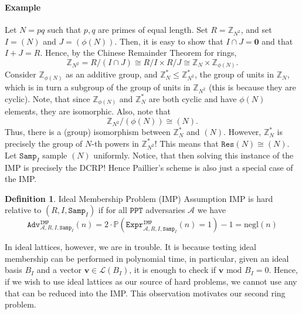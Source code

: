 \documentclass{article}
\theoremstyle{definition}
\newtheorem{definition}{Definition}[section]
\theoremstyle{example}
\newcommand{\A}{\mathcal{A}}
\renewcommand{\L}{\mathcal{L}}
\newcommand{\Prob}{\mathbb{P}}
\newcommand{\Int}{\mathbb{Z}}
\newcommand{\PPT}{\texttt{PPT}}
\newcommand{\negl}{\text{negl}}
\renewcommand{\mod}{\,\,\text{mod}\,\,}
\newcommand{\Expr}[2]{\texttt{Expr}^{\texttt{#1}}_{#2}}
\newcommand{\Adv}[2]{\texttt{Adv}^{\texttt{#1}}_{#2}}
\newcommand{\Samp}{\texttt{Samp}}
\renewcommand{\vec}[1]{\mathbf{#1}}
\begin{document}
\paragraph{Example}
  Let $N = pq$ such that $p, q$ are primes of equal length. Set $R =
  \Int_{N^2}$, and set $I = (N)$ and $J = (\phi(N))$. Then, it is easy to show
  that $I \cap J = \textbf{0}$ and that $I + J = R$. Hence, by the Chinese
  Remainder Theorem for rings,
  \[
    \Int_{N^2} = R/(I \cap J) \cong R/I \times R/J \cong \Int_N \times \Int_{\phi(N)}.
  \]
  Consider $\Int_{\phi(N)}$ as an additive group, and $\Int_N^* \leq
  \Int_{N^2}^*$, the group of units in $\Int_N$, which is in turn a subgroup of
  the group of units in $\Int_{N^2}$ (this is because they are cyclic). Note,
  that since $\Int_{\phi(N)}$ and $\Int_N^*$ are both cyclic and have $\phi(N)$
  elements, they are isomorphic. Also, note that
  \[
    \Int_{N^2}/(\phi(N)) \cong (N).
  \]
  Thus, there is a (group) isomorphism between $\Int_N^*$ and $(N)$. However,
  $\Int_N^*$ is precisely the group of $N$-th powers in $\Int_{N^2}^*$! This
  means that $\texttt{Res}(N) \cong (N)$. Let $\Samp_I$ sample $(N)$ uniformly.
  Notice, that then solving this instance of the IMP is precisely the DCRP! Hence
  Paillier's scheme is also just a special case of the IMP.
\begin{definition}{Ideal Membership Problem (IMP) Assumption}
  IMP is hard relative to $(R, I, \Samp_I)$ if for all $\PPT$ adversaries $\A$ we have
  \[
    \Adv{IMP}{\A, R, I, \Samp_I}(n) = 2 \cdot \Prob(\Expr{IMP}{\A, R, I, \Samp_I}(n) = 1) - 1 = \negl(n)
  \]
\end{definition}
In ideal lattices, however, we are in trouble. It is because testing ideal
membership can be performed in polynomial time, in particular, given an ideal basis
$B_I$ and a vector $\vec{v} \in \L(B_I)$, it is enough to check if $\vec{v}
\mod B_I = 0$. Hence, if we wish to use ideal lattices as our source of hard
problems, we cannot use any that can be reduced into the IMP. This observation
motivates our second ring problem.
\end{document}
